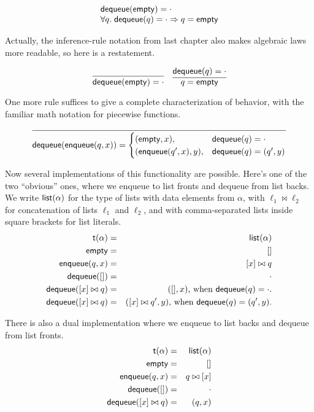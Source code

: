 \documentclass{amsbook}
\theoremstyle{definition}
\theoremstyle{remark}
\numberwithin{section}{chapter}
\numberwithin{equation}{chapter}
\begin{document}
$$\begin{array}{l}
  \mathsf{dequeue}(\mathsf{empty}) = \cdot \\
  \forall q. \; \mathsf{dequeue}(q) = \cdot \Rightarrow q = \mathsf{empty} \\
\end{array}$$

Actually, the inference-rule notation from last chapter also makes algebraic laws more readable, so here is a restatement.

$$\infer{\mt{dequeue}(\mt{empty}) = \cdot}{}
\quad \infer{q = \mt{empty}}{\mt{dequeue}(q) = \cdot}$$

One more rule suffices to give a complete characterization of behavior, with the familiar math notation for piecewise functions.

$$\infer{\mt{dequeue}(\mt{enqueue}(q, x)) = \begin{cases}
    (\mt{empty}, x), & \mt{dequeue}(q) = \cdot \\
    (\mt{enqueue}(q', x), y), & \mt{dequeue}(q) = (q', y)
  \end{cases}}{}$$

\newcommand{\concat}[2]{#1 \bowtie #2}

Now several implementations of this functionality are possible.
Here's one of the two ``obvious'' ones, where we enqueue to list fronts and dequeue from list backs.
We write $\mathsf{list}(\alpha)$ for the type of lists with data elements from $\alpha$, with $\concat{\ell_1}{\ell_2}$ for concatenation of lists $\ell_1$ and $\ell_2$, and with comma-separated lists inside square brackets for list literals.
\begin{eqnarray*}
  \mt{t(\alpha)} &=& \mt{list}(\alpha) \\
  \mt{empty} &=& [] \\
  \mt{enqueue}(q, x) &=& \concat{[x]}{q} \\
  \mt{dequeue}([]) &=& \cdot \\
  \mt{dequeue}(\concat{[x]}{q}) &=& ([], x)\textrm{, when $\mt{dequeue}(q) = \cdot$.} \\
  \mt{dequeue}(\concat{[x]}{q}) &=& (\concat{[x]}{q'}, y)\textrm{, when $\mt{dequeue}(q) = (q', y)$.}
\end{eqnarray*}

There is also a dual implementation where we enqueue to list backs and dequeue from list fronts.
\begin{eqnarray*}
  \mt{t(\alpha)} &=& \mt{list}(\alpha) \\
  \mt{empty} &=& [] \\
  \mt{enqueue}(q, x) &=& \concat{q}{[x]} \\
  \mt{dequeue}([]) &=& \cdot \\
  \mt{dequeue}(\concat{[x]}{q}) &=& (q, x)
\end{eqnarray*}
\end{document}
